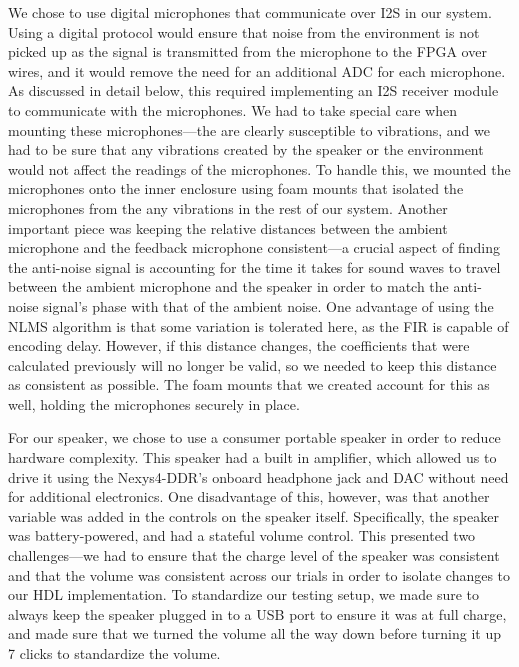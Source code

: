 \documentclass{fpgairpods}
\begin{document}
We chose to use digital microphones that communicate over I2S in our system. Using a digital protocol would ensure that noise from the environment is not picked up as the signal is transmitted from the microphone to the FPGA over wires, and it would remove the need for an additional ADC for each microphone. As discussed in detail below, this required implementing an I2S receiver module to communicate with the microphones. We had to take special care when mounting these microphones---the are clearly susceptible to vibrations, and we had to be sure that any vibrations created by the speaker or the environment would not affect the readings of the microphones. To handle this, we mounted the microphones onto the inner enclosure using foam mounts that isolated the microphones from the any vibrations in the rest of our system. Another important piece was keeping the relative distances between the ambient microphone and the feedback microphone consistent---a crucial aspect of finding the anti-noise signal is accounting for the time it takes for sound waves to travel between the ambient microphone and the speaker in order to match the anti-noise signal's phase with that of the ambient noise. One advantage of using the NLMS algorithm is that some variation is tolerated here, as the FIR is capable of encoding delay. However, if this distance changes, the coefficients that were calculated previously will no longer be valid, so we needed to keep this distance as consistent as possible. The foam mounts that we created account for this as well, holding the microphones securely in place. 

For our speaker, we chose to use a consumer portable speaker in order to reduce hardware complexity. This speaker had a built in amplifier, which allowed us to drive it using the Nexys4-DDR's onboard headphone jack and DAC without need for additional electronics. One disadvantage of this, however, was that another variable was added in the controls on the speaker itself. Specifically, the speaker was battery-powered, and had a stateful volume control. This presented two challenges---we had to ensure that the charge level of the speaker was consistent and that the volume was consistent across our trials in order to isolate changes to our HDL implementation. To standardize our testing setup, we made sure to always keep the speaker plugged in to a USB port to ensure it was at full charge, and made sure that we turned the volume all the way down before turning it up 7 clicks to standardize the volume. %
\end{document}
